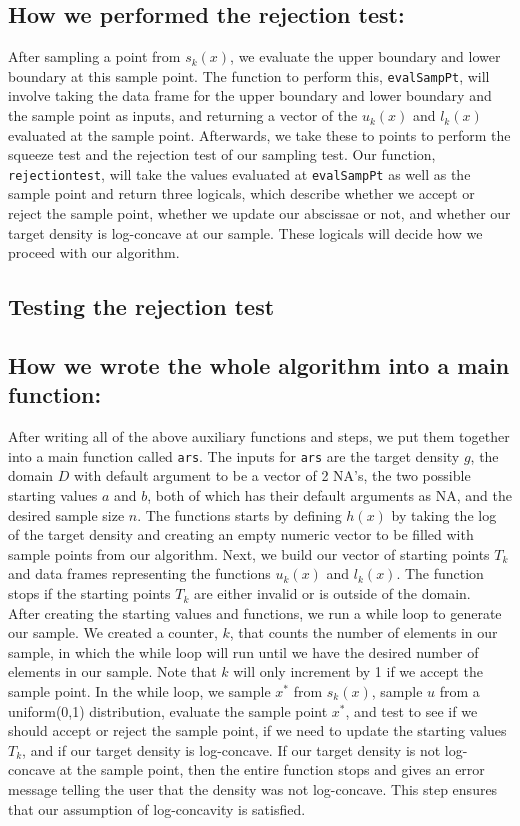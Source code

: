 \documentclass[12pt]{article}\usepackage[]{graphicx}\usepackage[]{color}
\begin{document}
\subsection*{How we performed the rejection test:}

After sampling a point from $s_k(x)$, we evaluate the upper boundary and lower boundary at this sample point.  The function to perform this, \texttt{evalSampPt}, will involve taking  the data frame for the upper boundary and lower boundary and the sample point as inputs, and returning a vector of the $u_k(x)$ and $l_k(x)$ evaluated at the sample point.  Afterwards, we take these to points to perform the squeeze test and the rejection test of our sampling test.  Our function, \texttt{rejectiontest}, will take the values evaluated at \texttt{evalSampPt} as well as the sample point and return three logicals, which describe whether we accept or reject the sample point, whether we update our abscissae or not, and whether our target density is log-concave at our sample.  These logicals will decide how we proceed with our algorithm.  

\subsection*{Testing the rejection test}

\subsection*{How we wrote the whole algorithm into a main function:}
After writing all of the above auxiliary functions and steps, we put them together into a main function called \texttt{ars}.  The inputs for \texttt{ars} are the target density $g$, the domain $D$ with default argument to be a vector of 2 NA's, the two possible starting values $a$ and $b$, both of which has their default arguments as NA, and the desired sample size $n$.  The functions starts by defining $h(x)$ by taking the log of the target density and creating an empty numeric vector to be filled with sample points from our algorithm.  Next, we build our vector of starting points $T_k$ and data frames representing the functions $u_k(x)$ and $l_k(x)$.  The function stops if the starting points $T_k$ are either invalid or is outside of the domain.  \\

After creating the starting values and functions, we run a while loop to generate our sample.  We created a counter, $k$, that counts the number of elements in our sample, in which the while loop will run until we have the desired number of elements in our sample. Note that $k$ will only increment by 1 if we accept the sample point.  In the while loop, we sample $x^*$ from $s_k(x)$, sample $u$ from a uniform(0,1) distribution, evaluate the sample point $x^*$, and test to see if we should accept or reject the sample point, if we need to update the starting values $T_k$, and if our target density is log-concave.  If our target density is not log-concave at the sample point, then the entire function stops and gives an error message telling the user that the density was not log-concave.  This step ensures that our assumption of log-concavity is satisfied.\\
\end{document}
